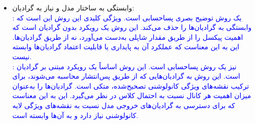 \documentclass[12pt]{article}
\begin{document}
\begin{enumerate}
\begin{enumerate}
\begin{itemize}
             \item وابستگی به ساختار مدل و نیاز به گرادیان:\\
             \textcolor{blue}{
             : یک روش توضیح بصری پساحسابی است. ویژگی کلیدی این روش این است که وابستگی به گرادیان‌ها را حذف می‌کند. این روش یک رویکرد بدون گرادیان است که اهمیت پیکسل را از طریق مقدار شاپلی به‌دست می‌آورد، نه از طریق گرادیان‌ها. این به این معناست که عملکرد آن به پایداری یا قابلیت اعتماد گرادیان‌ها وابسته نیست.}\\
             \textcolor{blue}{
            : نیز یک روش پساحسابی است. این روش اساساً یک رویکرد مبتنی بر گرادیان است. این روش به گرادیان‌هایی که از طریق پس‌انتشار محاسبه می‌شوند، برای ترکیب نقشه‌های ویژگی کانولوشنی تصحیح‌شده، متکی است.  گرادیان‌ها را به‌عنوان میزان اهمیت هر کانال نسبت به احتمال کلاس در نظر می‌گیرد. این به این معناست که برای دسترسی به گرادیان‌های خروجی مدل نسبت به نقشه‌های ویژگی لایه کانولوشنی نیاز دارد و به آن‌ها وابسته است.}
            

\end{itemize}
\end{enumerate}
\end{enumerate}
\end{document}
